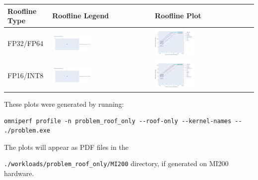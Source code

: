 \documentclass[
]{article}
\let\oldtexttt\texttt
\renewcommand{\texttt}[1]{
  \colorbox{Light}{\oldtexttt{#1}}
}
\begin{document}
\begin{longtable}[]{@{}lll@{}}
\toprule
Roofline Type & Roofline Legend & Roofline Plot\tabularnewline
\midrule
\endhead
FP32/FP64 &
\includegraphics[width=0.4\textwidth,height=0.4\textheight]{omniperf/launch_parameters/8575851bf3f9ac056a2eae0e721d44cde6e9378a.png} &
\includegraphics[width=0.4\textwidth,height=0.4\textheight]{omniperf/launch_parameters/1c1e7ac9bcf47ad1d9ab16625d90a45bcc6dc51f.png}\tabularnewline
FP16/INT8 &
\includegraphics[width=0.4\textwidth,height=0.4\textheight]{omniperf/launch_parameters/8575851bf3f9ac056a2eae0e721d44cde6e9378a.png} &
\includegraphics[width=0.4\textwidth,height=0.4\textheight]{omniperf/launch_parameters/aeb466a8cd337877bd21ecfe9b9a109f5a42050b.png}\tabularnewline
\bottomrule
\end{longtable}

These plots were generated by running:

\begin{Verbatim}
omniperf profile -n problem_roof_only --roof-only --kernel-names -- ./problem.exe
\end{Verbatim}

The plots will appear as PDF files in the
\texttt{./workloads/problem\_roof\_only/MI200} directory, if generated
on MI200 hardware.
\end{document}
